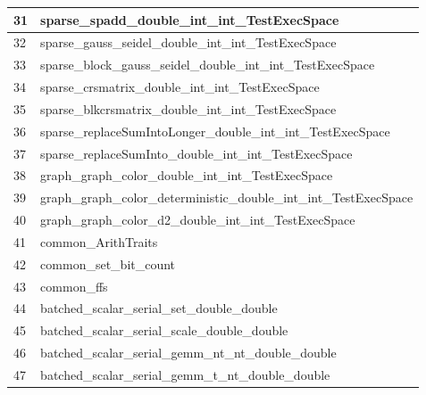\begin{table}[!htbp]
{\begin{tabular}{|>{\columncolor[HTML]{34FF34}}l |l|}
            \cellcolor[HTML]{FF00FF}31 & sparse\_spadd\_double\_int\_int\_TestExecSpace                      \\ \hline
            \cellcolor[HTML]{FF00FF}32 & sparse\_gauss\_seidel\_double\_int\_int\_TestExecSpace              \\ \hline
            \cellcolor[HTML]{FF00FF}33 & sparse\_block\_gauss\_seidel\_double\_int\_int\_TestExecSpace       \\ \hline
            \cellcolor[HTML]{FF00FF}34 & sparse\_crsmatrix\_double\_int\_int\_TestExecSpace                  \\ \hline
            \cellcolor[HTML]{FF00FF}35 & sparse\_blkcrsmatrix\_double\_int\_int\_TestExecSpace               \\ \hline
            \cellcolor[HTML]{FF00FF}36 & sparse\_replaceSumIntoLonger\_double\_int\_int\_TestExecSpace       \\ \hline
            \cellcolor[HTML]{FF00FF}37 & sparse\_replaceSumInto\_double\_int\_int\_TestExecSpace             \\ \hline
            \cellcolor[HTML]{FF00FF}38 & graph\_graph\_color\_double\_int\_int\_TestExecSpace                \\ \hline
            \cellcolor[HTML]{FF00FF}39 & graph\_graph\_color\_deterministic\_double\_int\_int\_TestExecSpace \\ \hline
            \cellcolor[HTML]{FF00FF}40 & graph\_graph\_color\_d2\_double\_int\_int\_TestExecSpace            \\ \hline
            \cellcolor[HTML]{FF00FF}41 & common\_ArithTraits                                                 \\ \hline
            42                         & common\_set\_bit\_count                                             \\ \hline
            43                         & common\_ffs                                                         \\ \hline
            \cellcolor[HTML]{FE0000}44 & batched\_scalar\_serial\_set\_double\_double                        \\ \hline
            45                         & batched\_scalar\_serial\_scale\_double\_double                      \\ \hline
            46                         & batched\_scalar\_serial\_gemm\_nt\_nt\_double\_double               \\ \hline
            47                         & batched\_scalar\_serial\_gemm\_t\_nt\_double\_double                \\ \hline
            \end{tabular}

}
\end{table}
